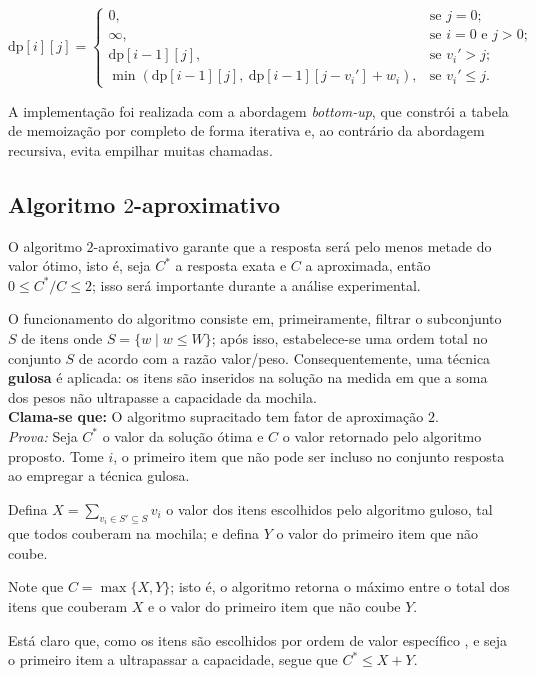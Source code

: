 \documentclass[12pt]{article}
\begin{document}
\[
\text{dp}[i][j] = 
\begin{cases}
0, & \text{se } j = 0;\\
\infty, & \text{se } i = 0 \text{ e } j > 0;\\
\text{dp}[i-1][j], & \text{se } v_i' > j;\\
\min\left(\text{dp}[i-1][j],\ \text{dp}[i-1][j - v_i'] + w_i\right), & \text{se } v_i' \leq j.
\end{cases}
\]

A implementação foi realizada com a abordagem \textit{bottom-up}, que constrói a tabela de memoização por completo de forma iterativa e, ao contrário da abordagem recursiva, evita empilhar muitas chamadas.


\subsection{Algoritmo \(2\)-aproximativo}

O algoritmo \(2\)-aproximativo garante que a resposta será pelo menos metade do valor ótimo, isto é, seja \(C^*\) a resposta exata e \(C\) a aproximada, então \(0 \leq C^*/C \leq 2\); isso será importante durante a análise experimental.

O funcionamento do algoritmo consiste em, primeiramente, filtrar o subconjunto \(S\) de itens onde \(S = \{w \mid w \leq W\}\); após isso, estabelece-se uma ordem total no conjunto \(S\) de acordo com a razão valor/peso. Consequentemente, uma técnica \textbf{gulosa} é aplicada: os itens são inseridos na solução na medida em que a soma dos pesos não ultrapasse a capacidade da mochila.\\
\textbf{Clama-se que:} O algoritmo supracitado tem fator de aproximação \(2\).\\
\textit{Prova:} Seja \(C^*\) o valor da solução ótima e \(C\) o valor retornado pelo algoritmo proposto. Tome \(i\), o primeiro item que não pode ser incluso no conjunto resposta ao empregar a técnica gulosa.

Defina \(X = \sum_{v_i \in S' \subseteq S}v_i\) o valor dos itens escolhidos pelo algoritmo guloso, tal que todos couberam na mochila; e defina \(Y\) o valor do primeiro item que não coube.

Note que \(C = \max\{X,Y\}\); isto é, o algoritmo retorna o máximo entre o total dos itens que couberam \(X\) e o valor do primeiro item que não coube \(Y\).

Está claro que, como os itens são escolhidos por ordem de valor específico \cite{aprox}, e seja o primeiro item a ultrapassar a capacidade, segue que \(C^* \leq X+Y\). 
\end{document}
